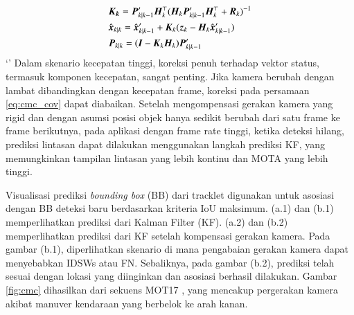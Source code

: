 \begin{equation}
  \begin{aligned}
  & \vb*{K_k} =  {{\vb*{P}}}^{\prime}_{k|k-1} \vb*{H}_k^\top (\vb*{H}_k  {{\vb*{P}}}^{\prime}_{k|k-1} \vb*{H}_k^\top + \vb*{R}_k)^{-1} \\
  & \hat{\vb*{x}}_{k|k} = \hat{\vb*{x}}^\prime_{k|k-1} + \vb*{K}_k (\vb*{z}_k - \vb*{H}_k \hat{\vb*{x}}^\prime_{k|k-1}) \\
  & \vb*{P}_{k|k} = (\vb*{I}- \vb*{K}_k \vb*{H}_k)  {{\vb*{P}}}^{\prime}_{k|k-1}
  \end{aligned}
  \label{eq:cmc_update_kf}
\end{equation} 
`'
Dalam skenario kecepatan tinggi, koreksi penuh terhadap vektor status, termasuk komponen kecepatan, sangat penting. Jika kamera berubah dengan lambat dibandingkan dengan kecepatan frame, koreksi pada persamaan \ref{eq:cmc_cov} dapat diabaikan. Setelah mengompensasi gerakan kamera yang rigid dan dengan asumsi posisi objek hanya sedikit berubah dari satu frame ke frame berikutnya, pada aplikasi dengan frame rate tinggi, ketika deteksi hilang, prediksi lintasan dapat dilakukan menggunakan langkah prediksi KF, yang memungkinkan tampilan lintasan yang lebih kontinu dan MOTA yang lebih tinggi.

Visualisasi prediksi \emph{bounding box} (BB) dari tracklet digunakan untuk asosiasi dengan BB deteksi baru berdasarkan kriteria IoU maksimum. (a.1) dan (b.1) memperlihatkan prediksi dari Kalman Filter (KF). (a.2) dan (b.2) memperlihatkan prediksi dari KF setelah kompensasi gerakan kamera. Pada gambar (b.1), diperlihatkan skenario di mana pengabaian gerakan kamera dapat menyebabkan IDSWs atau FN. Sebaliknya, pada gambar (b.2), prediksi telah sesuai dengan lokasi yang diinginkan dan asosiasi berhasil dilakukan. Gambar \ref{fig:cmc} dihasilkan dari sekuens MOT17 \cite{milan2016mot16}, yang mencakup pergerakan kamera akibat manuver kendaraan yang berbelok ke arah kanan.

